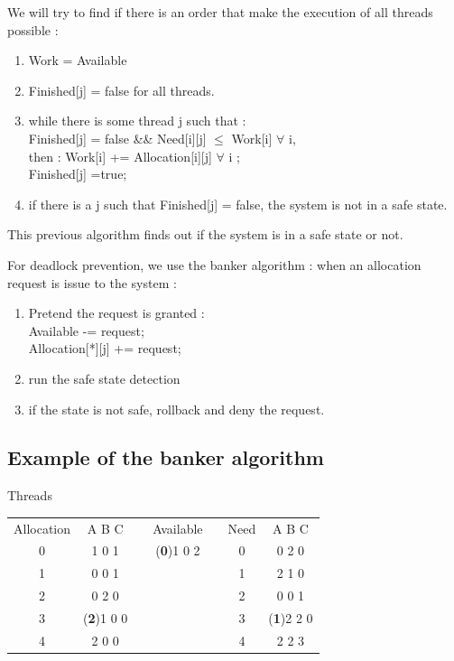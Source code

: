 \documentclass[a4paper,10pt]{article}
\begin{document}
We will try to find if there is an order that make the execution of all threads possible :

\begin{enumerate}
  \item Work = Available
  \item Finished[j] = false for all threads.
  \item while there is some thread j such that : \\ Finished[j] = false \&\& Need[i][j] $\leq$ Work[i] $\forall$ i, \\then : Work[i] += Allocation[i][j] $\forall$ i ; \\Finished[j] =true;
  \item if there is a j such that Finished[j] = false, the system is not in a safe state.
\end{enumerate}

This previous algorithm finds out if the system is in a safe state or not.

For deadlock prevention, we use the banker algorithm : when an allocation request is issue to the system :

\begin{enumerate}

  \item Pretend the request is granted : \\ Available -= request; \\ Allocation[*][j] += request;
  \item run the safe state detection
  \item if the state is not safe, rollback and deny the request.
  
\end{enumerate}

\subsection{Example of the banker algorithm}


  \begin{center}
  Threads
    \begin{tabular}{ccccccc}
       Allocation& A B C & &Available & & Need & A B C\\
       0 & 1 0 1 & & (\textbf{0})1 0 2 & & 0 & 0 2 0 \\
       1 & 0 0 1 & &  & & 1 & 2 1 0\\
       2 & 0 2 0 & &  & & 2 & 0 0 1\\
       3 & (\textbf{2})1 0 0 & &  & & 3 & (\textbf{1})2 2 0\\
       4 & 2 0 0 & &  & & 4 & 2 2 3\\
    \end{tabular}
  \end{center}
\end{document}
